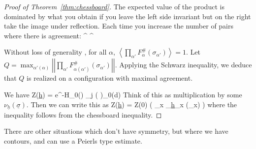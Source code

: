 \documentclass[12pt]{book}
\theoremstyle{norm}
\begin{document}
\begin{proof}[Proof of Theorem~\ref{thm:chessboard}]

The expected value of the product is dominated by what you obtain if you leave the left side invariant but on the right take the image under reflection. Each time you increase the number of pairs where there is agreement:
\be
\left{}\right\rangle\le
\left{}\right\rangle^{} 
\left{}\right\rangle^{}
\ee

 Without loss of generality , for all $\alpha$, $\left\langle {\prod_{\alpha'} F_\alpha^{\#} (\sigma_{\alpha'})}\right\rangle=1$. Let $Q=\max_{\alpha'(\alpha)} \left| {\left| {\prod_{\alpha'} F^{\#}_{\alpha(\alpha')}(\sigma_{\alpha'})} \right|} \right|$.  Applying the Schwarz inequality, we deduce that $Q$ is realized on a configuration with maximal agreement.

We have 
\be
Z(\underline{h}) = \int e^{-\beta H_0(\sigma)} \prod_j \left( {} \right)\rho_0(d\sigma)
\ee
Think of this as multiplication by some $\nu_{\underline{h}}(\underline{\sigma})$. 
Then we can write this as 
\be
Z(\underline{h}) = Z(0) \left( {\prod_x \nu_{\underline{h}_x} (\underline{\sigma}_x)} \right) 
\ee
where the inequality follows from the chessboard inequality.
\end{proof}

There are other situations which don't have symmetry, but where we have contours, and can use a Peierls type estimate. 
\end{document}
